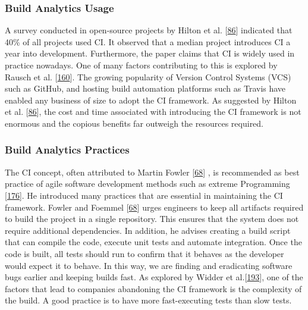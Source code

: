 \documentclass[]{book}
\begin{document}
\subsubsection{Build Analytics Usage}\label{build-analytics-usage}

A survey conducted in open-source projects by Hilton et al.
{[}\protect\hyperlink{ref-hilton2016usage}{86}{]} indicated that 40\% of
all projects used CI. It observed that a median project introduces CI a
year into development. Furthermore, the paper claims that CI is widely
used in practice nowadays. One of many factors contributing to this is
explored by Rausch et al.
{[}\protect\hyperlink{ref-rausch2017empirical}{160}{]}. The growing
popularity of Version Control Systems (VCS) such as GitHub, and hosting
build automation platforms such as Travis have enabled any business of
size to adopt the CI framework. As suggested by Hilton et al.
{[}\protect\hyperlink{ref-hilton2016usage}{86}{]}, the cost and time
associated with introducing the CI framework is not enormous and the
copious benefits far outweigh the resources required.

\subsubsection{Build Analytics
Practices}\label{build-analytics-practices}

The CI concept, often attributed to Martin Fowler
{[}\protect\hyperlink{ref-fowler2006continuous}{68}{]} , is recommended
as best practice of agile software development methods such as extreme
Programming {[}\protect\hyperlink{ref-stolberg2009enabling}{176}{]}. He
introduced many practices that are essential in maintaining the CI
framework. Fowler and Foemmel
{[}\protect\hyperlink{ref-fowler2006continuous}{68}{]} urges engineers
to keep all artifacts required to build the project in a single
repository. This ensures that the system does not require additional
dependencies. In addition, he advises creating a build script that can
compile the code, execute unit tests and automate integration. Once the
code is built, all tests should run to confirm that it behaves as the
developer would expect it to behave. In this way, we are finding and
eradicating software bugs earlier and keeping builds fast. As explored
by Widder et al.{[}\protect\hyperlink{ref-widder2018m}{193}{]}, one of
the factors that lead to companies abandoning the CI framework is the
complexity of the build. A good practice is to have more fast-executing
tests than slow tests.
\end{document}
